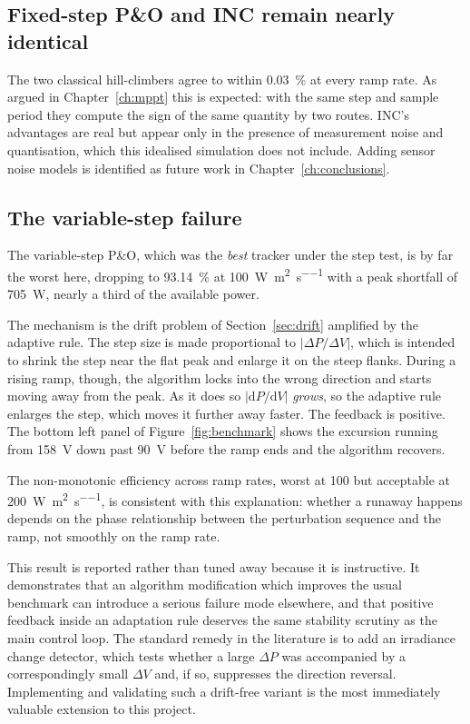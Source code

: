 \subsection{Fixed-step P\&O and INC remain nearly identical}

The two classical hill-climbers agree to within \SI{0.03}{\percent} at every
ramp rate. As argued in Chapter~\ref{ch:mppt} this is expected: with the same
step and sample period they compute the sign of the same quantity by two routes.
INC's advantages are real but appear only in the presence of measurement noise
and quantisation, which this idealised simulation does not include. Adding
sensor noise models is identified as future work in
Chapter~\ref{ch:conclusions}.

\subsection{The variable-step failure}

The variable-step P\&O, which was the \emph{best} tracker under the step test,
is by far the worst here, dropping to \SI{93.14}{\percent} at
\SI{100}{\watt\per\square\metre\per\second} with a peak shortfall of
\SI{705}{\watt}, nearly a third of the available power.

The mechanism is the drift problem of Section~\ref{sec:drift} amplified by the
adaptive rule. The step size is made proportional to $|\Delta P / \Delta V|$,
which is intended to shrink the step near the flat peak and enlarge it on the
steep flanks. During a rising ramp, though, the algorithm locks into the wrong
direction and starts moving away from the peak. As it does so
$|\mathrm{d}P/\mathrm{d}V|$ \emph{grows}, so the adaptive rule enlarges the
step, which moves it further away faster. The feedback is positive. The bottom
left panel of Figure~\ref{fig:benchmark} shows the excursion running from
\SI{158}{\volt} down past \SI{90}{\volt} before the ramp ends and the algorithm
recovers.

The non-monotonic efficiency across ramp rates, worst at \SI{100}{} but
acceptable at \SI{200}{\watt\per\square\metre\per\second}, is consistent with
this explanation: whether a runaway happens depends on the phase relationship
between the perturbation sequence and the ramp, not smoothly on the ramp rate.

This result is reported rather than tuned away because it is instructive. It
demonstrates that an algorithm modification which improves the usual benchmark
can introduce a serious failure mode elsewhere, and that positive feedback
inside an adaptation rule deserves the same stability scrutiny as the main
control loop. The standard remedy in the literature is to add an irradiance
change detector, which tests whether a large $\Delta P$ was accompanied by a
correspondingly small $\Delta V$ and, if so, suppresses the direction reversal.
Implementing and validating such a drift-free variant is the most immediately
valuable extension to this project.
